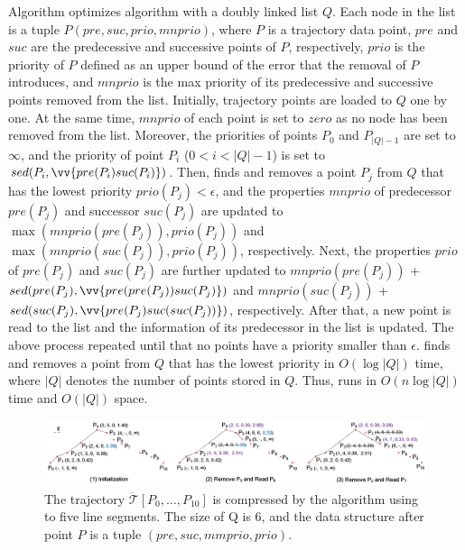 Algorithm \squishe optimizes algorithm \tpa with a doubly linked list $Q$. Each node in the list is a tuple $P(pre, suc, prio, mnprio)$, where $P$ is a trajectory data point, $pre$ and $suc$ are the predecessive  and successive points of $P$, respectively,  $prio$ is the priority of $P$ defined as an upper bound of the \sed error that the removal of $P$ introduces, and $mnprio$ is the max priority of its predecessive and successive points removed from the list.
%
Initially, trajectory points are loaded to $Q$ one by one.
At the same time, $mnprio$ of each point is set to $zero$ as no node has been removed from the list.
Moreover, the priorities of points $P_0$ and $P_{|Q|-1}$ are set to $\infty$, and the priority of point $P_i$ ($0<i<|Q|-1$) is set to $sed(P_i, \vv{pre(P_{i})suc(P_{i})})$.
%
Then, \squishe finds and removes a point $P_j$ from $Q$ that has the lowest priority $prio(P_j)<\epsilon$, and the properties $mnprio$ of predecessor $pre(P_j)$ and successor $suc(P_j)$ are updated to $\max(mnprio(pre(P_j)), prio(P_j))$ and $\max(mnprio(suc(P_j)), prio(P_j))$, respectively.
Next, the properties $prio$ of $pre(P_j)$ and $suc(P_j)$ are further updated to $mnprio(pre(P_j))$ + $sed(pre(P_j), \vv{pre(pre(P_{j}))suc(P_{j})})$ and $mnprio(suc(P_j))$ + $sed(suc(P_j),\vv{pre(P_{j})suc(suc(P_{j}))})$, respectively.
%
After that, a new point is read to the list and the information of its predecessor in the list is updated.
%
The above process repeated until that no points have a priority smaller than $\epsilon$.
%
\squishe finds and removes a point from $Q$ that has the lowest priority in $O(\log |Q|)$ time, where $|Q|$ denotes the number of points stored in $Q$.
Thus, \squishe runs in $O(n\log |Q|)$ time and $O(|Q|)$ space.



\begin{figure}[tb!]
	\centering
	\includegraphics[scale=0.48]{Figures/Fig-Squishe.jpg}
	\vspace{-2ex}
	\caption{\small The trajectory $\dddot{\mathcal{T}}[P_0, \ldots, P_{10}]$ is compressed by the \squishe algorithm using \sed to five line segments. The size of Q is 6, and the data structure after point $P$ is a tuple $(pre, suc, mmprio, prio)$. }
	\vspace{-1ex}
	\label{fig:squishe}
\end{figure}



